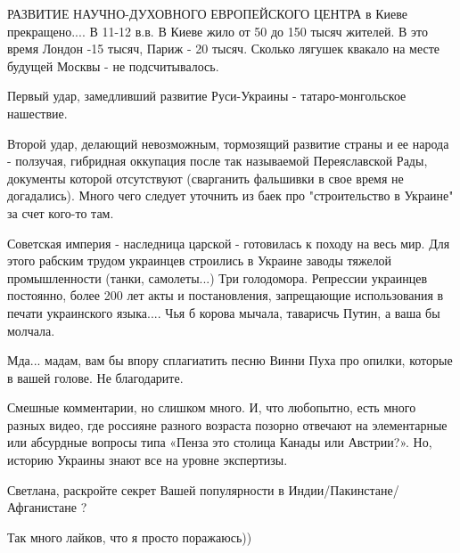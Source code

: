 \begin{itemize}
РАЗВИТИЕ НАУЧНО-ДУХОВНОГО ЕВРОПЕЙСКОГО ЦЕНТРА в Киеве прекращено.... В 11-12
в.в. В Киеве жило от 50 до 150 тысяч жителей. В это время Лондон -15 тысяч,
Париж - 20 тысяч. Сколько лягушек квакало на месте будущей Москвы - не
подсчитывалось.

Первый удар, замедливший развитие Руси-Украины - татаро-монгольское нашествие.

Второй удар, делающий невозможным, тормозящий развитие страны и ее народа -
ползучая, гибридная оккупация после так называемой Переяславской Рады,
документы которой отсутствуют (сварганить фальшивки в свое время не
догадались). Много чего следует уточнить из баек про "строительство в Украине"
за счет кого-то там. 

Советская империя - наследница царской - готовилась к походу на весь мир. Для
этого рабским трудом украинцев строились в Украине заводы тяжелой
промышленности (танки, самолеты...) Три голодомора. Репрессии украинцев
постоянно, более 200 лет акты и постановления, запрещающие использования в
печати украинского языка.... Чья б корова мычала, таварисчь Путин, а ваша бы
молчала.

 
Мда... мадам, вам бы впору сплагиатить песню Винни Пуха про опилки, которые в вашей голове. Не благодарите.

 

Смешные комментарии, но слишком много. И, что любопытно, есть много разных
видео, где россияне разного возраста позорно отвечают на элементарные или
абсурдные вопросы типа «Пенза это столица Канады или Австрии?». Но, историю
Украины знают все на уровне экспертизы.


 

Светлана, раскройте секрет Вашей популярности в Индии/Пакинстане/Афганистане ?

Так много лайков, что я просто поражаюсь))


\end{itemize}
